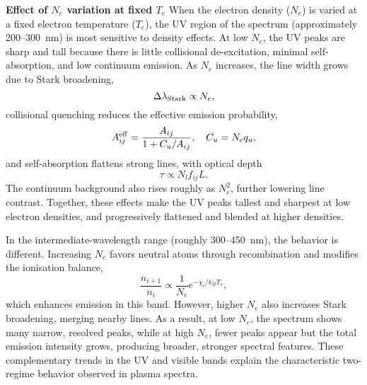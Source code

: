 \documentclass[12pt,a4paper]{article}
\begin{document}
	
	
	
	\textbf{Effect of $N_e$ variation at fixed $T_e$}
	When the electron density ($N_e$) is varied at a fixed electron temperature ($T_e$), the UV region of the spectrum (approximately 200--300~nm) is most sensitive to density effects. At low $N_e$, the UV peaks are sharp and tall because there is little collisional de-excitation, minimal self-absorption, and low continuum emission. As $N_e$ increases, the line width grows due to Stark broadening,
	\[
	\Delta \lambda_{\rm Stark} \propto N_e,
	\]
	collisional quenching reduces the effective emission probability,
	\[
	A_{ij}^{\rm eff} = \frac{A_{ij}}{1 + C_u/A_{ij}}, \quad C_u = N_e q_u,
	\]
	and self-absorption flattens strong lines, with optical depth
	\[
	\tau \propto N_l f_{ij} L.
	\]
	The continuum background also rises roughly as $N_e^2$, further lowering line contrast. Together, these effects make the UV peaks tallest and sharpest at low electron densities, and progressively flattened and blended at higher densities.  
	
	In the intermediate-wavelength range (roughly 300--450~nm), the behavior is different. Increasing $N_e$ favors neutral atoms through recombination and modifies the ionisation balance,
	\[
	\frac{n_{i+1}}{n_i} \propto \frac{1}{N_e} e^{-\chi_i/k_B T_e},
	\]
	which enhances emission in this band. However, higher $N_e$ also increases Stark broadening, merging nearby lines. As a result, at low $N_e$, the spectrum shows many narrow, resolved peaks, while at high $N_e$, fewer peaks appear but the total emission intensity grows, producing broader, stronger spectral features. These complementary trends in the UV and visible bands explain the characteristic two-regime behavior observed in plasma spectra.
	
	\newpage
	
	

	
\end{document}
